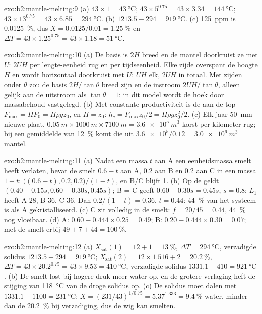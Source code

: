 \begin{solution}{exo:b2:mantle-melting:9}
(a) $43\times1 = \qty{43}{\celsius}$; $43\times5^{0.75} = 43\times3.34 =
\qty{144}{\celsius}$; $43\times13^{0.75} = 43\times6.85 = \qty{294}{\celsius}$.
(b) $1213.5 - 294 = \qty{919}{\celsius}$. (c) \qty{125}{ppm} is
\qty{0.0125}{\percent}, dus $X = 0.0125/0.01 = \qty{1.25}{\percent}$ en $\Delta T =
43\times1.25^{0.75} = 43\times1.18 = \qty{51}{\celsius}$.
\end{solution}

\begin{solution}{exo:b2:mantle-melting:10}
(a) De basis is $2H$ breed en de mantel doorkruist ze met $U$: $2UH$ per lengte-eenheid
rug en per tijdseenheid. Elke zijde overspant de hoogte $H$ en wordt horizontaal doorkruist met
$U$: $UH$ elk, $2UH$ in totaal. Met zijden onder $\theta$ zou de basis
$2H/\tan\theta$ breed zijn en de instroom $2UH/\tan\theta$, alleen gelijk aan de uitstroom als
$\tan\theta = 1$: in dit model wordt de hoek door massabehoud vastgelegd. (b) Met
constante productiviteit is de  aan de top $F_{\max} = \Pi P_0 = \Pi\rho
g z_0$, en $H = z_0$: $h_c = F_{\max}z_0/2 = \Pi\rho g z_0^2/2$. (c) Elk jaar
\qty{50}{mm} nieuwe plaat, $\qty{0.05}{m}\times\qty{1000}{m}\times\qty{7100}{m} =
\qty{3.6e5}{m^3}$ korst per kilometer rug; bij een gemiddelde  van \qty{12}{\percent}
komt die uit $\num{3.6e5}/0.12 = \qty{3.0e6}{m^3}$ mantel.
\end{solution}

\begin{solution}{exo:b2:mantle-melting:11}
(a) Nadat een massa $t$ aan A een eenheidsmassa smelt heeft verlaten, bevat de smelt $0.6 -
t$ aan A, 0.2 aan B en 0.2 aan C in een massa $1 - t$: $\big((0.6 - t), 0.2,
0.2\big)/(1 - t)$, en B/C blijft 1. (b) Op de  geldt $(0.40 - 0.15s, 0.60 -
0.30s, 0.45s)$; B = C geeft $0.60 - 0.30s = 0.45s$, $s = 0.8$: $L_1$ heeft A 28, B
36, C 36. Dan $0.2/(1 - t) = 0.36$, $t = 0.44$: \qty{44}{\percent} van het systeem is
als A gekristalliseerd. (c) C zit volledig in de smelt: $f = 20/45 = 0.44$,
\qty{44}{\percent} nog vloeibaar. (d) A: $0.60 - 0.444\times0.25 = 0.49$; B: $0.20 -
0.444\times0.30 = 0.07$; met de smelt erbij $49 + 7 + 44 = \qty{100}{\percent}$.
\end{solution}

\begin{solution}{exo:b2:mantle-melting:12}
(a) $X_{\mathrm{sat}}(1) = 12 + 1 = \qty{13}{\percent}$, $\Delta T =
\qty{294}{\celsius}$, verzadigde solidus $1213.5 - 294 = \qty{919}{\celsius}$;
$X_{\mathrm{sat}}(2) = 12\times1.516 + 2 = \qty{20.2}{\percent}$, $\Delta T =
43\times20.2^{0.75} = 43\times9.53 = \qty{410}{\celsius}$, verzadigde solidus $1331.1
- 410 = \qty{921}{\celsius}$. (b) De smelt lost bij hogere druk meer water op,
en de grotere verlaging heft de stijging van \qty{118}{\celsius} van de droge solidus op.
(c) De solidus moet dalen met $1331.1 - 1100 = \qty{231}{\celsius}$: $X =
(231/43)^{1/0.75} = 5.37^{1.333} = \qty{9.4}{\percent}$ water, minder dan de
\qty{20.2}{\percent} bij verzadiging, dus de wig kan smelten.
\end{solution}


